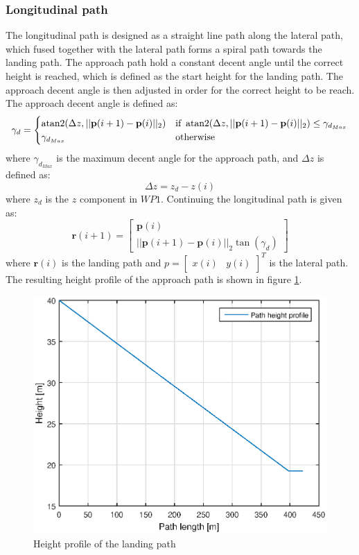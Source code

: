 \subsubsection{Longitudinal path}
The longitudinal path is designed as a straight line path along the lateral path, which fused together with the lateral path forms a spiral path towards the landing path. The approach path hold a constant decent angle until the correct height is reached, which is defined as the start height for the landing path. The approach decent angle is then adjusted in order for the correct height to be reach. The approach decent angle is defined as:
\begin{equation}
\gamma_d = \begin{cases}
\atan2(\Delta z,||\mathbf{p}(i+1)-\mathbf{p}(i)||_2) & \text{if } \atan2(\Delta z,||\mathbf{p}(i+1)-\mathbf{p}(i)||_2)\leq \gamma_{d_{Max}} \\
\gamma_{d_{Max}}										& \text{otherwise}
\end{cases}
\end{equation}
where $\gamma_{d_{Max}}$ is the maximum decent angle for the approach path, and $\Delta z$ is defined as:
\begin{equation}
\Delta z = z_d-z(i)
\end{equation}
where $z_d$ is the $z$ component in $WP1$. Continuing the longitudinal path is given as:
\begin{equation}
\mathbf{r}(i+1) = \begin{bmatrix}
\mathbf{p}(i) \\
||\mathbf{p}(i+1)-\mathbf{p}(i)||_2\tan(\gamma_d)
\end{bmatrix}
\end{equation}
where $\mathbf{r}(i)$ is the landing path and 
$p = \begin{bmatrix}
x(i) & y(i)
\end{bmatrix}^T$ is the lateral path. The resulting height profile of the approach path is shown in figure \ref{Fig:HeightProfile}.
\begin{figure}[H]
	\centering
		\includegraphics[width=1\textwidth]{figs/SysPlot/heightProfile.eps}
		\caption{Height profile of the landing path}
		\label{Fig:HeightProfile}
\end{figure}
